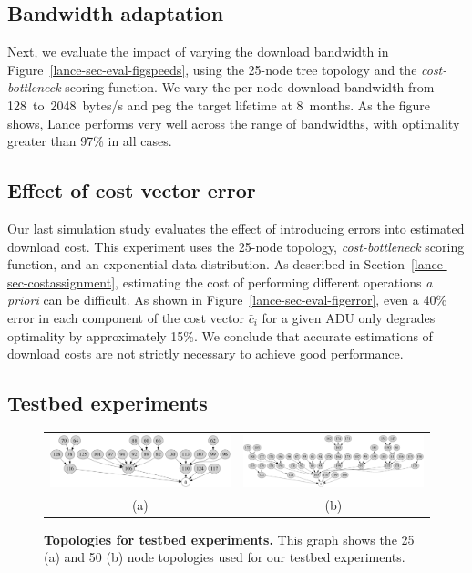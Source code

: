 \subsection{Bandwidth adaptation} 
\label{lance-sec-eval-params}

Next, we evaluate the impact of varying the download bandwidth in
Figure~\ref{lance-sec-eval-figspeeds}, using the 25-node tree topology and
the \emph{cost-bottleneck} scoring function. We vary the per-node download
bandwidth from 128~to~2048~bytes/s and peg the target lifetime at 8~months.
As the figure shows, Lance performs very well across the range of bandwidths,
with optimality greater than 97\% in all cases.

\subsection{Effect of cost vector error}

Our last simulation study evaluates the effect of introducing errors into
estimated download cost. This experiment uses the 25-node topology,
\emph{cost-bottleneck} scoring function, and an exponential data
distribution.  As described in Section~\ref{lance-sec-costassignment}, estimating
the cost of performing different operations {\em a priori} can be difficult.
As shown in Figure~\ref{lance-sec-eval-figerror}, even a 40\% error in each
component of the cost vector $\bar{c}_i$ for a given ADU only degrades
optimality by approximately 15\%. We conclude that accurate estimations
of download costs are not strictly necessary to achieve good performance.


\subsection{Testbed experiments}
\label{lance-sec-eval-policies}

\begin{figure}[t]
\label{lance-sec-eval-topologies}
\begin{center}
\begin{tabular}{cc}
\includegraphics[width=0.45\hsize]{./6-lance/figs/gwa/topologies/25.pdf} &
\includegraphics[width=0.45\hsize]{./6-lance/figs/gwa/topologies/50.pdf} \\
(a) &
(b)\\
\end{tabular}
\end{center}
\caption{\textbf{Topologies for testbed experiments.} 
This graph shows the 25 (a) and 50 (b) node topologies used for our testbed
experiments.}
\end{figure}

